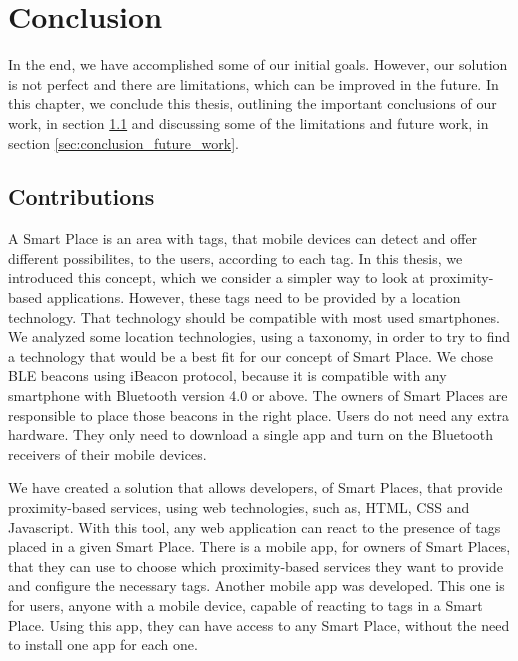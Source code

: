 
\chapter{Conclusion}
\label{chapter:conclusion}
In the end, we have accomplished some of our initial goals.
However, our solution is not perfect and there are limitations, which can be improved in the future.
In this chapter, we conclude this thesis, outlining the important conclusions of our work, in section \ref{sec:conclusion_contributions} and discussing some of the limitations and future work, in section \ref{sec:conclusion_future_work}.

\section{Contributions}
\label{sec:conclusion_contributions}
A Smart Place is an area with tags, that mobile devices can detect and offer different possibilites, to the users, according to each tag.
In this thesis, we introduced this concept, which we consider a simpler way to look at proximity-based applications.
However, these tags need to be provided by a location technology.
That technology should be compatible with most used smartphones.
We analyzed some location technologies, using a taxonomy\cite{location}, in order to try to find a technology that would be a best fit for our concept of Smart Place.
We chose \gls{BLE} beacons using iBeacon protocol, because it is compatible with any smartphone with Bluetooth version 4.0 or above.
The owners of Smart Places are responsible to place those beacons in the right place.
Users do not need any extra hardware.
They only need to download a single app and turn on the Bluetooth receivers of their mobile devices.

We have created a solution that allows developers, of Smart Places, that provide proximity-based services, using web technologies, such as, \gls{HTML}, \gls{CSS} and Javascript.
With this tool, any web application can react to the presence of tags placed in a given Smart Place.
There is a mobile app, for owners of Smart Places, that they can use to choose which proximity-based services they want to provide and configure the necessary tags.
Another mobile app was developed.
This one is for users, anyone with a mobile device, capable of reacting to tags in a Smart Place.
Using this app, they can have access to any Smart Place, without the need to install one app for each one.

